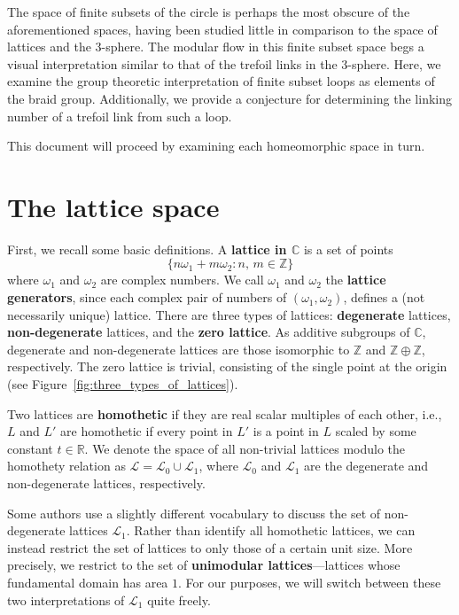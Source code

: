 \documentclass[12pt,twoside]{reedthesis}
\theoremstyle{definition}
\newcommand{\Z}{\mathbb{Z}}
\newcommand{\R}{\mathbb{R}}
\newcommand{\C}{\mathbb{C}}
\newcommand{\LS}{\mathcal{L}}
\newcommand{\defnphrase}[1]{\textbf{#1}}
\begin{document}
The space of finite subsets of the circle is perhaps the most obscure of the aforementioned spaces, having been studied little in comparison to the space of lattices and the 3-sphere.
The modular flow in this finite subset space begs a visual interpretation similar to that of the trefoil links in the 3-sphere.
Here, we examine the group theoretic interpretation of finite subset loops as elements of the braid group.
Additionally, we provide a conjecture for determining the linking number of a trefoil link from such a loop.

This document will proceed by examining each homeomorphic space in turn.

\chapter{The lattice space}

First, we recall some basic definitions. A \defnphrase{lattice in $\C$} is a set of points
\begin{equation*}
  \{ n \omega_1 + m \omega_2 : n,\, m \in \Z \}
\end{equation*}
where $\omega_1$ and $\omega_2$ are complex numbers.
We call $\omega_1$ and $\omega_2$ the \defnphrase{lattice generators}, since each complex pair of numbers of $(\omega_1, \omega_2)$, defines a (not necessarily unique) lattice.
There are three types of lattices: \defnphrase{degenerate} lattices, \defnphrase{non-degenerate} lattices, and the \defnphrase{zero lattice}.
As additive subgroups of $\C$, degenerate and non-degenerate lattices are those isomorphic to $\Z$ and $\Z \oplus \Z$, respectively.
The zero lattice is trivial, consisting of the single point at the origin (see Figure~\ref{fig:three_types_of_lattices}).

Two lattices are \defnphrase{homothetic} if they are real scalar multiples of each other, i.e., $L$ and $L'$ are homothetic if every point in $L'$ is a point in $L$ scaled by some constant $t \in \R$.
We denote the space of all non-trivial lattices modulo the homothety relation as $\LS = \LS_0 \cup \LS_1$, where $\LS_0$ and $\LS_1$ are the degenerate and non-degenerate lattices, respectively.

Some authors use a slightly different vocabulary to discuss the set of non-degenerate lattices $\LS_1$. Rather than identify all homothetic lattices, we can instead restrict the set of lattices to only those of a certain unit size. More precisely, we restrict to the set of \defnphrase{unimodular lattices}---lattices whose fundamental domain has area $1$. For our purposes, we will switch between these two interpretations of $\LS_1$ quite freely.
\end{document}
